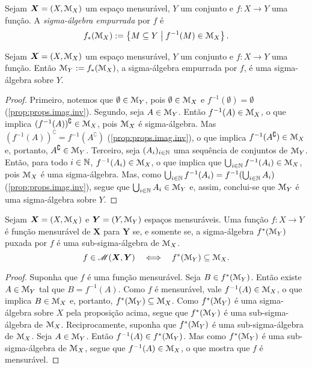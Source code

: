 \begin{definition}
Sejam $\bm X = (X,\mathcal{M}_X)$ um espaço mensurável, $Y$ um conjunto e $f: X \to Y$ uma função. A \emph{sigma-álgebra empurrada} por $f$ é
	\begin{equation*}
	f_*(\mathcal{M}_X) := \left\{{M \subseteq Y}\;\middle\vert\;{f^{-1}(M) \in \mathcal{M}_X}\right\}.
	\end{equation*}
\end{definition}

\begin{proposition}
Sejam $\bm X = (X,\mathcal{M}_X)$ um espaço mensurável, $Y$ um conjunto e $f: X \to Y$ uma função. Então $\mathcal{M}_Y := f_*(\mathcal{M}_X)$, a sigma-álgebra empurrada por $f$, é uma sigma-álgebra sobre $Y$.
\end{proposition}
\begin{proof}
Primeiro, notemos que $\emptyset \in \mathcal{M}_Y$, pois $\emptyset \in \mathcal{M}_X$ e $f^{-1}(\emptyset) = \emptyset$ (\ref{prop:props.imag.inv}). Segundo, seja $A \in \mathcal{M}_Y$. Então $f^{-1}(A) \in \mathcal{M}_ X$, o que implica $(f^{-1}(A))^\complement \in \mathcal{M}_ X$, pois $\mathcal{M}_ X$ é sigma-álgebra. Mas $(f^{-1}(A))^\complement = f^{-1}(A^\complement)$ (\ref{prop:props.imag.inv}), o que implica $f^{-1}(A^\complement) \in \mathcal{M}_ X$ e, portanto, $A^\complement \in \mathcal{M}_ Y$. Terceiro, seja $(A_i)_{i \in \mathbb{N}}$ uma sequência de conjuntos de $\mathcal{M}_ Y$. Então, para todo $i \in \mathbb{N}$, $f^{-1}(A_i) \in \mathcal{M}_ X$, o que implica que $\bigcup_{i \in \mathbb{N}} f^{-1}(A_i) \in \mathcal{M}_ X$, pois $\mathcal{M}_ X$ é uma sigma-álgebra. Mas, como $\bigcup_{i \in \mathbb{N}} f^{-1}(A_i) = f^{-1}(\bigcup_{i \in \mathbb{N}} A_i)$ (\ref{prop:props.imag.inv}), segue que $\bigcup_{i \in \mathbb{N}} A_i \in \mathcal{M}_ Y$ e, assim, conclui-se que $\mathcal{M}_ Y$ é uma sigma-álgebra sobre $Y$.
\end{proof}

\begin{proposition}
Sejam $\bm X = (X,\mathcal{M}_ X)$ e $\bm Y = (Y,\mathcal{M}_ Y)$ espaços mensuráveis. Uma função $f: X \to Y$ é função mensurável de $\bm X$ para $\bm Y$ se, e somente se, a sigma-álgebra $f^*(\mathcal{M}_Y)$ puxada por $f$ é uma sub-sigma-álgebra de $\mathcal{M}_ X$.
	\begin{equation*}
	f \in \mathscr{M}(\bm X,\bm Y) \quad \Longleftrightarrow \quad f^*(\mathcal{M}_Y) \subseteq \mathcal{M}_X.
	\end{equation*}
\end{proposition}
\begin{proof}
Suponha que $f$ é uma função mensurável. Seja $B \in f^*(\mathcal{M}_Y)$. Então existe $A \in \mathcal{M}_ Y$ tal que $B = f^{-1}(A)$. Como $f$ é mensurável, vale $f^{-1}(A) \in \mathcal{M}_ X$, o que implica $B \in \mathcal{M}_ X$ e, portanto, $f^*(\mathcal{M}_Y) \subseteq \mathcal{M}_ X$. Como $f^*(\mathcal{M}_Y)$ é uma sigma-álgebra sobre $X$ pela proposição acima, segue que $f^*(\mathcal{M}_Y)$ é uma sub-sigma-álgebra de $\mathcal{M}_ X$. Reciprocamente, suponha que $f^*(\mathcal{M}_Y)$ é uma sub-sigma-álgebra de $\mathcal{M}_ X$. Seja $A \in \mathcal{M}_ Y$. Então $f^{-1}(A) \in f^*(\mathcal{M}_Y)$. Mas como $f^*(\mathcal{M}_Y)$ é uma sub-sigma-álgebra de $\mathcal{M}_ X$, segue que $f^{-1}(A) \in \mathcal{M}_ X$, o que mostra que $f$ é mensurável.
\end{proof}






